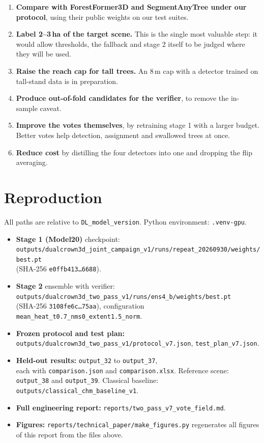 \documentclass[11pt,a4paper]{article}
\newcommand{\code}[1]{\texttt{#1}}
\begin{document}
\begin{enumerate}
  \item \textbf{Compare with ForestFormer3D and SegmentAnyTree under our protocol}, using their public weights on our test suites.
  \item \textbf{Label 2--3\,ha of the target scene.} This is the single most valuable step: it would allow thresholds, the fallback and stage 2 itself to be judged where they will be used.
  \item \textbf{Raise the reach cap for tall trees.} An 8\,m cap with a detector trained on tall-stand data is in preparation.
  \item \textbf{Produce out-of-fold candidates for the verifier}, to remove the in-sample caveat.
  \item \textbf{Improve the votes themselves}, by retraining stage 1 with a larger budget. Better votes help detection, assignment and swallowed trees at once.
  \item \textbf{Reduce cost} by distilling the four detectors into one and dropping the flip averaging.
\end{enumerate}

\appendix
\section{Reproduction}

All paths are relative to \code{DL\_model\_version}. Python environment: \code{.venv-gpu}.

\begin{itemize}
  \item \textbf{Stage 1 (Model20)} checkpoint:\\ \code{outputs/dualcrown3d\_joint\_campaign\_v1/runs/repeat\_20260930/weights/best.pt}\\ (SHA-256 \code{e0ffb413\ldots 6688}).
  \item \textbf{Stage 2} ensemble with verifier:\\ \code{outputs/dualcrown3d\_two\_pass\_v1/runs/ens4\_b/weights/best.pt}\\ (SHA-256 \code{3108fe6c\ldots 75aa}), configuration \code{mean\_heat\_t0.7\_nms0\_extent1.5\_norm}.
  \item \textbf{Frozen protocol and test plan:}\\ \code{outputs/dualcrown3d\_two\_pass\_v1/protocol\_v7.json}, \code{test\_plan\_v7.json}.
  \item \textbf{Held-out results:} \code{output\_32} to \code{output\_37},\\ each with \code{comparison.json} and \code{comparison.xlsx}. Reference scene: \code{output\_38} and \code{output\_39}. Classical baseline:\\ \code{outputs/classical\_chm\_baseline\_v1}.
  \item \textbf{Full engineering report:} \code{reports/two\_pass\_v7\_vote\_field.md}.
  \item \textbf{Figures:} \code{reports/technical\_paper/make\_figures.py} regenerates all figures of this report from the files above.
\end{itemize}
\end{document}
